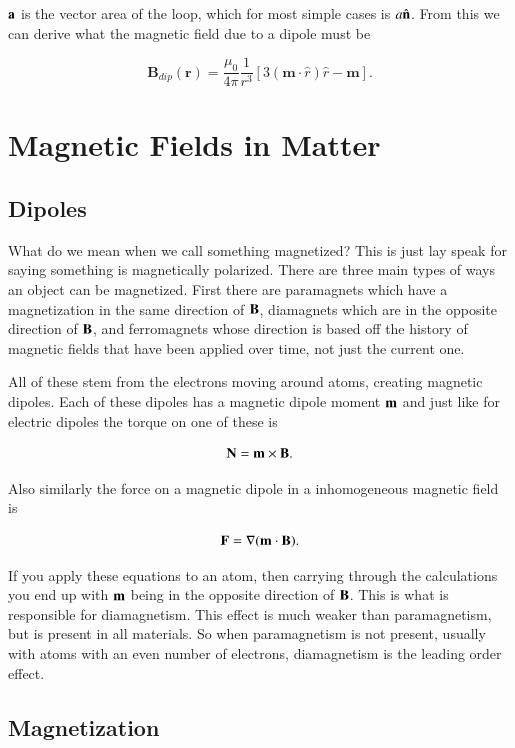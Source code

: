 \documentclass[preprint, review,12pt]{elsarticle}
\def\m{\frac{\mu_0}{4\pi}}
\def\x{\times}
\def\.{\cdot}
\def\b{\textbf}
\newcommand{\hb}[1]{\hat{\b #1}}
\begin{document}
$\b a$ is the vector area of the loop, which for most simple cases is $a\hb{n}$. From this we can derive what the magnetic field due to a dipole must be

\begin{equation}
    \b{B}_{dip}(\b{r}) = \m \frac{1}{r^3}[3(\b{m} \. \hat{r})\hat{r} - \b{m}].
\end{equation}

\section{Magnetic Fields in Matter}

\subsection{Dipoles}

What do we mean when we call something magnetized? This is just lay speak for saying something is magnetically polarized. There are three main types of ways an object can be magnetized. First there are paramagnets which have a magnetization in the same direction of $\b B$, diamagnets which are in the opposite direction of $\b B$, and ferromagnets whose direction is based off the history of magnetic fields that have been applied over time, not just the current one.

All of these stem from the electrons moving around atoms, creating magnetic dipoles. Each of these dipoles has a magnetic dipole moment $\b m$ and just like for electric dipoles the torque on one of these is

\begin{equation}
    \b N = \b m \x \b B.
\end{equation}

Also similarly the force on a magnetic dipole in a inhomogeneous magnetic field is

\begin{equation}
    \b F = \nabla (\b m \. \b B).
\end{equation}

If you apply these equations to an atom, then carrying through the calculations you end up with $\b m$ being in the opposite direction of $\b B$. This is what is responsible for diamagnetism. This effect is much weaker than paramagnetism, but is present in all materials. So when paramagnetism is not present, usually with atoms with an even number of electrons, diamagnetism is the leading order effect.

\subsection{Magnetization}
\end{document}
